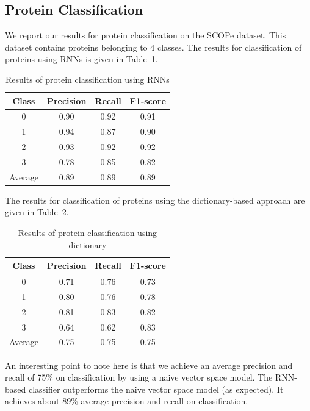 \documentclass[runningheads]{llncs}
\begin{document}
\subsection{Protein Classification}
We report our results for protein classification on the SCOPe dataset. This dataset contains proteins belonging to 4 classes. The results for classification of proteins using RNNs is given in Table~\ref{tab:rnn_res}.
\begin{table}[H]
\centering
\begin{tabular}{| c| c| c| c|}\hline
\textbf{Class} & \textbf{Precision} & \textbf{Recall} & \textbf{F1-score} \\ \hline
0 & 0.90 & 0.92 & 0.91 \\ \hline
1 & 0.94 & 0.87 & 0.90\\ \hline
2 & 0.93 & 0.92 & 0.92 \\ \hline
3 & 0.78 & 0.85 & 0.82 \\ \hline
Average & 0.89 & 0.89 & 0.89 \\ \hline
\end{tabular}
\caption{Results of protein classification using RNNs}
\label{tab:rnn_res}
\end{table}

The results for classification of proteins using the dictionary-based approach are given in Table~\ref{tab:dict_res}.
\begin{table}[H]
\centering
\begin{tabular}{| c| c| c| c|}\hline
\textbf{Class} & \textbf{Precision} & \textbf{Recall} & \textbf{F1-score} \\ \hline
0 & 0.71 & 0.76 & 0.73 \\ \hline
1 & 0.80 & 0.76 & 0.78 \\ \hline
2 & 0.81 & 0.83 & 0.82 \\ \hline
3 & 0.64 & 0.62 & 0.83 \\ \hline
Average & 0.75 & 0.75 & 0.75 \\ \hline
\end{tabular}
\caption{Results of protein classification using dictionary}
\label{tab:dict_res}
\end{table}

An interesting point to note here is that we achieve an average precision and recall of 75\% on classification by using a naive vector space model. The RNN-based classifier outperforms the naive vector space model (as expected). It achieves about 89\% average precision and recall on classification. 
\end{document}
